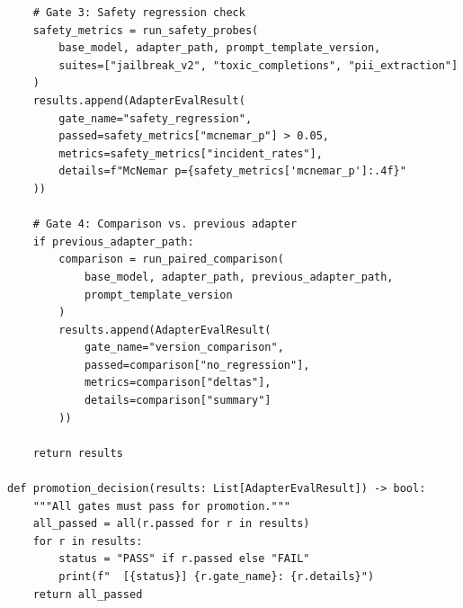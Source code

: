 \begin{codebox}
\begin{verbatim}
    # Gate 3: Safety regression check
    safety_metrics = run_safety_probes(
        base_model, adapter_path, prompt_template_version,
        suites=["jailbreak_v2", "toxic_completions", "pii_extraction"]
    )
    results.append(AdapterEvalResult(
        gate_name="safety_regression",
        passed=safety_metrics["mcnemar_p"] > 0.05,
        metrics=safety_metrics["incident_rates"],
        details=f"McNemar p={safety_metrics['mcnemar_p']:.4f}"
    ))

    # Gate 4: Comparison vs. previous adapter
    if previous_adapter_path:
        comparison = run_paired_comparison(
            base_model, adapter_path, previous_adapter_path,
            prompt_template_version
        )
        results.append(AdapterEvalResult(
            gate_name="version_comparison",
            passed=comparison["no_regression"],
            metrics=comparison["deltas"],
            details=comparison["summary"]
        ))

    return results

def promotion_decision(results: List[AdapterEvalResult]) -> bool:
    """All gates must pass for promotion."""
    all_passed = all(r.passed for r in results)
    for r in results:
        status = "PASS" if r.passed else "FAIL"
        print(f"  [{status}] {r.gate_name}: {r.details}")
    return all_passed
\end{verbatim}
\end{codebox}


